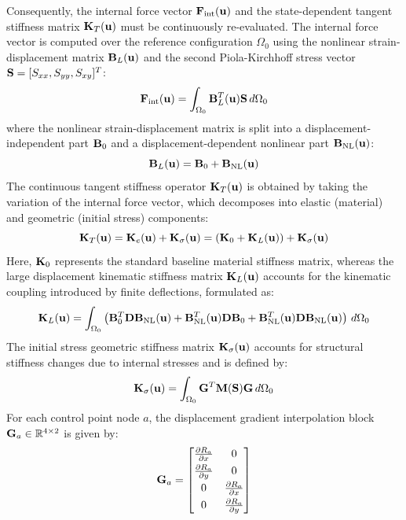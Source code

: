 Consequently, the internal force vector $\mathbf{F}_{\text{int}}(\mathbf{u})$ and the state-dependent tangent stiffness matrix $\mathbf{K}_T(\mathbf{u})$ must be continuously re-evaluated. The internal force vector is computed over the reference configuration $\Omega_0$ using the nonlinear strain-displacement matrix $\mathbf{B}_L(\mathbf{u})$ and the second Piola-Kirchhoff stress vector $\mathbf{S} = [S_{xx}, S_{yy}, S_{xy}]^T$:
\begin{equation}
        \mathbf{F}_{\text{int}}(\mathbf{u}) = \int_{\Omega_0} \mathbf{B}_L^T(\mathbf{u}) \mathbf{S} \, d\Omega_0
\end{equation}
where the nonlinear strain-displacement matrix is split into a displacement-independent part $\mathbf{B}_0$ and a displacement-dependent nonlinear part $\mathbf{B}_{\text{NL}}(\mathbf{u})$:
\begin{equation}
        \mathbf{B}_L(\mathbf{u}) = \mathbf{B}_0 + \mathbf{B}_{\text{NL}}(\mathbf{u})
\end{equation}
The continuous tangent stiffness operator $\mathbf{K}_T(\mathbf{u})$ is obtained by taking the variation of the internal force vector, which decomposes into elastic (material) and geometric (initial stress) components:
\begin{equation}
    \mathbf{K}_T(\mathbf{u}) = \mathbf{K}_e(\mathbf{u}) + \mathbf{K}_{\sigma}(\mathbf{u}) = \left( \mathbf{K}_0 + \mathbf{K}_L(\mathbf{u}) \right) + \mathbf{K}_{\sigma}(\mathbf{u})
\end{equation}
Here, $\mathbf{K}_0$ represents the standard baseline material stiffness matrix, whereas the large displacement kinematic stiffness matrix $\mathbf{K}_L(\mathbf{u})$ accounts for the kinematic coupling introduced by finite deflections, formulated as:
\begin{equation}
        \mathbf{K}_L(\mathbf{u}) = \int_{\Omega_0} \left( \mathbf{B}_0^T \mathbf{D} \mathbf{B}_{\text{NL}}(\mathbf{u}) + \mathbf{B}_{\text{NL}}^T(\mathbf{u}) \mathbf{D} \mathbf{B}_0 + \mathbf{B}_{\text{NL}}^T(\mathbf{u}) \mathbf{D} \mathbf{B}_{\text{NL}}(\mathbf{u}) \right) \, d\Omega_0
\end{equation}
The initial stress geometric stiffness matrix $\mathbf{K}_{\sigma}(\mathbf{u})$ accounts for structural stiffness changes due to internal stresses and is defined by:
\begin{equation}
        \mathbf{K}_{\sigma}(\mathbf{u}) = \int_{\Omega_0} \mathbf{G}^T \mathbf{M}(\mathbf{S}) \mathbf{G} \, d\Omega_0
\end{equation}
For each control point node $a$, the displacement gradient interpolation block $\mathbf{G}_a \in \mathbb{R}^{4 \times 2}$ is given by:
\begin{equation}
        \mathbf{G}_a = \begin{bmatrix} \frac{\partial R_a}{\partial x} & 0 \\[0.3em] \frac{\partial R_a}{\partial y} & 0 \\[0.3em] 0 & \frac{\partial R_a}{\partial x} \\[0.3em] 0 & \frac{\partial R_a}{\partial y} \end{bmatrix}
\end{equation}
